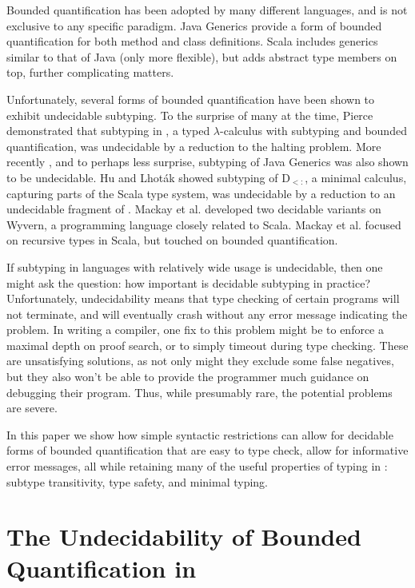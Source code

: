 \documentclass[runningheads, anon]{llncs}
\begin{document}
Bounded quantification has been adopted by many different languages, and is not exclusive to any specific paradigm.
Java Generics provide a form of bounded quantification for both method and class definitions.
Scala includes generics similar to that of Java (only more flexible), but adds abstract type members on top, further complicating matters.

Unfortunately, several forms of bounded quantification have been shown to exhibit undecidable subtyping.
To the surprise of many at the time, Pierce \cite{Pierce:1992:BQU:143165.143228} demonstrated that subtyping in \Fsub, a typed $\lambda$-calculus with subtyping and bounded quantification, 
was undecidable by a reduction to the halting problem.
More recently , and to perhaps less surprise, subtyping of Java Generics was also shown to be undecidable.
Hu and Lhot\'{a}k \cite{10.1145/3371077} showed subtyping of D$_{<:}$, a minimal calculus, capturing parts of the Scala type system, was undecidable by a reduction to an undecidable fragment of \Fsub.
Mackay et al. \cite{10.1145/3371134} developed two decidable variants on Wyvern, a programming language closely related to Scala. 
Mackay et al. focused on recursive types in Scala, but touched on bounded quantification.

If subtyping in languages with relatively wide usage is undecidable, then one might ask the question: how important is decidable subtyping in practice?
Unfortunately, undecidability means that type checking of certain programs will not terminate, and will eventually crash without any error message indicating the problem.
In writing a compiler, one fix to this problem might be to enforce a maximal depth on proof search, or to simply timeout during type checking. These are unsatisfying 
solutions, as not only might they exclude some false negatives, but they also won't be able to provide the programmer much guidance on debugging their program.
Thus, while presumably rare, the potential problems are severe.

In this paper we show how simple syntactic restrictions can allow for decidable forms of bounded quantification that are easy to type check, 
allow for informative error messages, all while retaining many of the useful properties of typing in \Fsub: subtype transitivity, type safety, and minimal typing.

\section{The Undecidability of Bounded Quantification in \Fsub}
\label{s:background}
\end{document}
